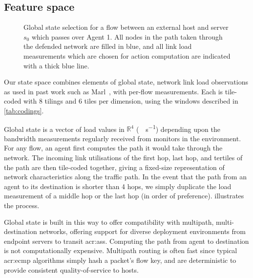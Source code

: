 \subsection{Feature space}\label{sec:feature-space}

\begin{figure}
	\centering
	\resizebox{0.9\linewidth}{!}{
		
	}
	\caption[Global state selection for a flow across a monitored AS.]{
		Global state selection for a flow between an external host and server $s_0$ which passes over Agent 1.
		All nodes in the path taken through the defended network are filled in blue, and all link load measurements which are chosen for action computation are indicated with a thick blue line.
		\label{fig:global-state-path}
	}
\end{figure}

Our state space combines elements of global state, network link load observations as used in past work such as Marl~\parencite{DBLP:journals/eaai/MalialisK15}, with per-flow measurements.
Each is tile-coded with \num{8} tilings and \num{6} tiles per dimension, using the windows described in \cref{tab:codings}.

Global state is a vector of load values in $\mathbb{R}^4$ (\unit{\mega\bit\per\second}) depending upon the bandwidth measurements regularly received from monitors in the environment.
For any flow, an agent first computes the path it would take through the network.
The incoming link utilisations of the first hop, last hop, and tertiles of the path are then tile-coded together, giving a fixed-size representation of network characteristics along the traffic path.
In the event that the path from an agent to its destination is shorter than \num{4} hops, we simply duplicate the load measurement of a middle hop or the last hop (in order of preference).
 illustrates the process.

Global state is built in this way to offer compatibility with multipath, multi-destination networks, offering support for diverse deployment environments from endpoint servers to transit \glspl{acr:as}.
Computing the path from agent to destination is not computationally expensive.
Multipath routing is often fast since typical \gls{acr:ecmp} algorithms simply hash a packet's flow key, and are deterministic to provide consistent quality-of-service to hosts.

